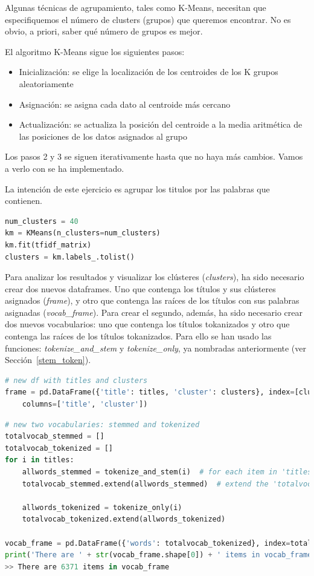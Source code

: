 \documentclass{uimppracticas}
\begin{document}
Algunas técnicas de agrupamiento, tales como K-Means, necesitan que especifiquemos el número de clusters (grupos) que queremos encontrar. No es obvio, a priori, saber qué número de grupos es mejor.


El algoritmo K-Means sigue los siguientes pasos:

\begin{itemize}
	\item Inicialización: se elige la localización de los centroides de los K grupos aleatoriamente
	\item Asignación: se asigna cada dato al centroide más cercano
	\item Actualización: se actualiza la posición del centroide a la media aritmética de las posiciones de los datos asignados al grupo
\end{itemize}

Los pasos 2 y 3 se siguen iterativamente hasta que no haya más cambios. Vamos a verlo con se ha implementado.

La intención de este ejercicio es agrupar los titulos por las palabras que contienen.

\begin{lstlisting}[language=python]
num_clusters = 40
km = KMeans(n_clusters=num_clusters)
km.fit(tfidf_matrix)
clusters = km.labels_.tolist()
\end{lstlisting}

Para analizar los resultados y visualizar los clústeres (\textit{clusters}), ha sido necesario crear dos nuevos dataframes. Uno que contenga los títulos y sus clústeres asignados (\textit{frame}), y otro que contenga las raíces de los títulos con sus palabras asignadas (\textit{vocab\_frame}). Para crear el segundo, además, ha sido necesario crear dos nuevos vocabularios: uno que contenga los títulos tokanizados y otro que contenga las raíces de los títulos tokanizados. Para ello se han usado las funciones: \textit{tokenize\_and\_stem} y \textit{tokenize\_only}, ya nombradas anteriormente (ver Sección~\ref{stem_token}).

\begin{lstlisting}[language=python]
# new df with titles and clusters
frame = pd.DataFrame({'title': titles, 'cluster': clusters}, index=[clusters], 
	columns=['title', 'cluster'])
\end{lstlisting}

\newpage
\begin{lstlisting}[language=python]
# new two vocabularies: stemmed and tokenized
totalvocab_stemmed = []
totalvocab_tokenized = []
for i in titles:
	allwords_stemmed = tokenize_and_stem(i)  # for each item in 'titles', tokenize/stem
	totalvocab_stemmed.extend(allwords_stemmed)  # extend the 'totalvocab_stemmed' list

	allwords_tokenized = tokenize_only(i)
	totalvocab_tokenized.extend(allwords_tokenized)
	
vocab_frame = pd.DataFrame({'words': totalvocab_tokenized}, index=totalvocab_stemmed)
print('There are ' + str(vocab_frame.shape[0]) + ' items in vocab_frame')
>> There are 6371 items in vocab_frame
\end{lstlisting}
\end{document}
